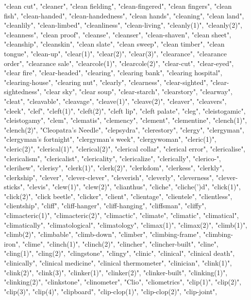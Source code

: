 "clean cut",
"cleaner",
"clean fielding",
"clean-fingered",
"clean fingers",
"clean fish",
"clean-handed",
"clean-handedness",
"clean hands",
"cleaning",
"clean land",
"cleanlily",
"clean-limbed",
"cleanliness",
"clean-living",
"cleanly(1)",
"cleanly(2)",
"cleanness",
"clean proof",
"cleanse",
"cleanser",
"clean-shaven",
"clean sheet",
"cleanship",
"cleanskin",
"clean slate",
"clean sweep",
"clean timber",
"clean tongue",
"clean-up",
"clear(1)",
"clear(2)",
"clear(3)",
"clearance",
"clearance order",
"clearance sale",
"clearcole(1)",
"clearcole(2)",
"clear-cut",
"clear-eyed",
"clear fire",
"clear-headed",
"clearing",
"clearing bank",
"clearing hospital",
"clearing-house",
"clearing nut",
"clearly",
"clearness",
"clear-sighted",
"clear-sightedness",
"clear sky",
"clear soup",
"clear-starch",
"clearstory",
"clearway",
"cleat",
"cleavable",
"cleavage",
"cleave(1)",
"cleave(2)",
"cleaver",
"cleavers",
"cleek",
"clef",
"cleft(1)",
"cleft(2)",
"cleft lip",
"cleft palate",
"cleg",
"cleistogamic",
"cleistogamy",
"clem",
"clematis",
"clemency",
"clement",
"clementine",
"clench(1)",
"clench(2)",
"Cleopatra's Needle",
"clepsydra",
"clerestory",
"clergy",
"clergyman",
"clergyman's fortnight",
"clergyman's week",
"clergywoman",
"cleric(1)",
"cleric(2)",
"clerical(1)",
"clerical(2)",
"clerical collar",
"clerical error",
"clericalise",
"clericalism",
"clericalist",
"clericality",
"clericalize",
"clerically",
"clerico-",
"clerihew",
"clerisy",
"clerk(1)",
"clerk(2)",
"clerkdom",
"clerkess",
"clerkly",
"clerkship",
"clever",
"clever-clever",
"cleverish",
"cleverly",
"cleverness",
"clever-sticks",
"clevis",
"clew(1)",
"clew(2)",
"clianthus",
"cliche",
"cliche(')d",
"click(1)",
"click(2)",
"click beetle",
"clicker",
"client",
"clientage",
"clientele",
"clientless",
"clientship",
"cliff",
"cliff-hanger",
"cliff-hanging",
"cliffsman",
"cliffy",
"climacteric(1)",
"climacteric(2)",
"climactic",
"climate",
"climatic",
"climatical",
"climatically",
"climatological",
"climatology",
"climax(1)",
"climax(2)",
"climb(1)",
"climb(2)",
"climbable",
"climb-down",
"climber",
"climbing-frame",
"climbing-iron",
"clime",
"clinch(1)",
"clinch(2)",
"clincher",
"clincher-built",
"cline",
"cling(1)",
"cling(2)",
"clingstone",
"clingy",
"clinic",
"clinical",
"clinical death",
"clinically",
"clinical medicine",
"clinical thermometer",
"clinician",
"clink(1)",
"clink(2)",
"clink(3)",
"clinker(1)",
"clinker(2)",
"clinker-built",
"clinking(1)",
"clinking(2)",
"clinkstone",
"clinometer",
"Clio",
"cliometrics",
"clip(1)",
"clip(2)",
"clip(3)",
"clip(4)",
"clipboard",
"clip-clop(1)",
"clip-clop(2)",
"clip-joint",
